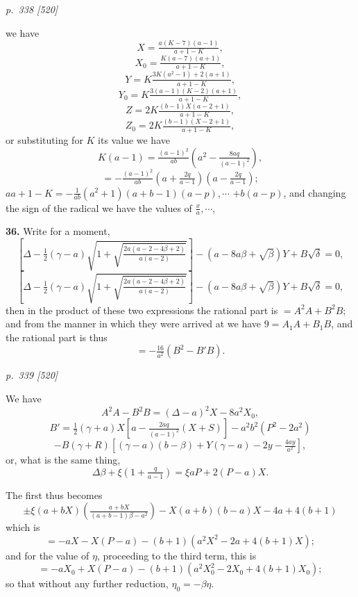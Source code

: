 \documentclass[11pt,a4paper]{book}
\begin{document}
\clearpage

\bigskip
\textit{p.~338 [520]}
\smallskip

we have
\[
X = \tfrac{a(K - 7)(a - 1)}{a + 1 - K},
\]
\[
X_0 = \tfrac{K(a - 7)(a + 1)}{a + 1 - K},
\]
\[
Y = K \tfrac{3K(a^2 - 1) + 2(a + 1)}{a + 1 - K},
\]
\[
Y_0 = K \tfrac{3(a - 1)(K - 2)(a + 1)}{a + 1 - K},
\]
\[
Z = 2K \tfrac{(b - 1)X(a - 2 + 1)}{a + 1 - K},
\]
\[
Z_0 = 2K \tfrac{(b - 1)(X - 2 + 1)}{a + 1 - K},
\]
or substituting for $K$ its value we have
\[
K(a - 1) = \tfrac{(a - 1)^2}{ab}\!\left(a^2 - \tfrac{8aq}{(a - 1)^2}\right),
\]
\[
= -\tfrac{(a - 1)^2}{ab}\!\left(a + \tfrac{2q}{a - 1}\right)\!\left(a - \tfrac{2q}{a - 1}\right);
\]
$a a + 1 - K = -\tfrac{1}{ab}(a^2 + 1)\!\left(a + b - 1\right)(a - p), \cdots$
$+ b\!(a - p)$,
and changing the sign of the radical we have the values of $\tfrac{x}{a}, \cdots$,

\textbf{36.} Write for a moment,
\[
\left[\Delta - \tfrac{1}{2}(\gamma - a)\sqrt{1 + \sqrt{\tfrac{2a(a - 2 - 4\beta + 2)}{a(a - 2)}}}\right] - (a - 8a\beta + \sqrt{\beta})Y + B\sqrt{\delta} = 0,
\]
\[
\left[\Delta - \tfrac{1}{2}(\gamma - a)\sqrt{1 + \sqrt{\tfrac{2a(a - 2 - 4\beta + 2)}{a(a - 2)}}}\right] - (a - 8a\beta + \sqrt{\beta})Y + B\sqrt{\delta} = 0,
\]
then in the product of these two expressions the rational part is $= A^2A + B^2B$; and from the manner in which they were arrived at we have $9 = A_1A + B_1B$, and the rational part is thus
\[
= -\tfrac{16}{a^2}(B^2 - B'B).
\]

\clearpage

\bigskip
\textit{p.~339 [520]}
\smallskip


We have
\[
A^2A - B^2B = (\Delta - a)^2 X - 8a^2 X_0,
\]
\[
B' = \tfrac{1}{2}(\gamma + a)X\!\left[a - \tfrac{2aq}{(a - 1)^2}(X + S)\right] - a^2 b^2(P^2 - 2a^2)
\]
\[
- B(\gamma + R)\!\left[(\gamma - a)(b - \beta) + Y(\gamma - a) - 2y - \tfrac{4ay}{a^2}\right],
\]
or, what is the same thing,
\[
\Delta\beta + \xi\!\left(1 + \tfrac{q}{a - 1}\right) = \xi a P + 2(P - a)X.
\]

The first thus becomes
\[
\pm \xi(a + bX)\!\left(\tfrac{a + b X}{(a + b - 1)\beta - a^2}\right) - X(a + b)(b - a)X - 4a + 4(b + 1)
\]
which is
\[
= -aX - X(P - a) - (b + 1)(a^2X^2 - 2a + 4(b + 1)X);
\]
and for the value of $\eta$, proceeding to the third term, this is
\[
= -aX_0 + X(P - a) - (b + 1)(a^2 X_0^2 - 2X_0 + 4(b + 1)X_0);
\]
so that without any further reduction, $\eta_0 = -\beta\eta$.
\end{document}

